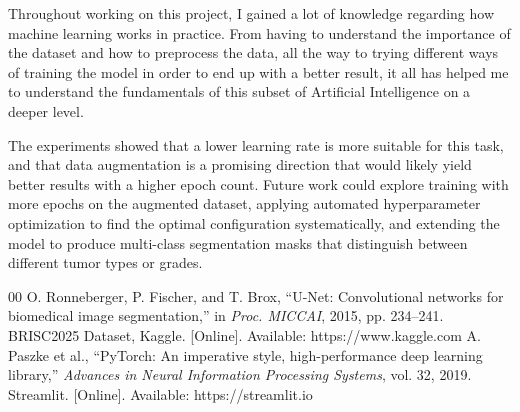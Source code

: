 \documentclass[conference]{IEEEtran}
\begin{document}
Throughout working on this project, I gained a lot of knowledge regarding how machine learning works in practice. From having to understand the importance of the dataset and how to preprocess the data, all the way to trying different ways of training the model in order to end up with a better result, it all has helped me to understand the fundamentals of this subset of Artificial Intelligence on a deeper level.

The experiments showed that a lower learning rate is more suitable for this task, and that data augmentation is a promising direction that would likely yield better results with a higher epoch count. Future work could explore training with more epochs on the augmented dataset, applying automated hyperparameter optimization to find the optimal configuration systematically, and extending the model to produce multi-class segmentation masks that distinguish between different tumor types or grades.

\begin{thebibliography}{00}
 O. Ronneberger, P. Fischer, and T. Brox, ``U-Net: Convolutional networks for biomedical image segmentation,'' in \textit{Proc. MICCAI}, 2015, pp. 234--241.
 BRISC2025 Dataset, Kaggle. [Online]. Available: https://www.kaggle.com
 A. Paszke et al., ``PyTorch: An imperative style, high-performance deep learning library,'' \textit{Advances in Neural Information Processing Systems}, vol. 32, 2019.
 Streamlit. [Online]. Available: https://streamlit.io
\end{thebibliography}
\end{document}
